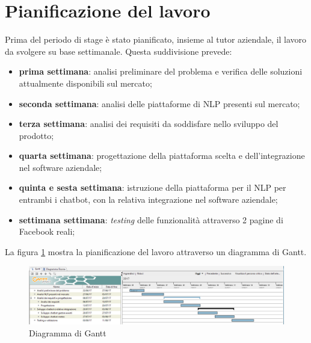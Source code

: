 \section{Pianificazione del lavoro}
Prima del periodo di stage è stato pianificato, insieme al tutor aziendale, il lavoro da svolgere su base settimanale. Questa suddivisione prevede:
\begin{itemize}
	\item \textbf{prima settimana}: analisi preliminare del problema e verifica delle soluzioni attualmente disponibili sul mercato;
	\item \textbf{seconda settimana}: analisi delle piattaforme di \gls{NLP} presenti sul mercato;
	\item \textbf{terza settimana}: analisi dei requisiti da soddisfare nello sviluppo del prodotto;
	\item \textbf{quarta settimana}: progettazione della piattaforma scelta e dell'integrazione nel software aziendale;
	\item \textbf{quinta e sesta settimana}: istruzione della piattaforma per il \gls{NLP} per entrambi i \gls{chatbot}, con la relativa integrazione nel software aziendale;
	\item \textbf{settimana settimana}: \emph{testing} delle funzionalità attraverso 2 pagine di Facebook reali;
\end{itemize}

La figura \ref{gantt} mostra la pianificazione del lavoro attraverso un diagramma di Gantt.
\begin{figure}[h]
	\centering
	\includegraphics[scale=0.4]{../Immagini/gantt.png}
	\caption{Diagramma di Gantt}\label{gantt}
\end{figure}

